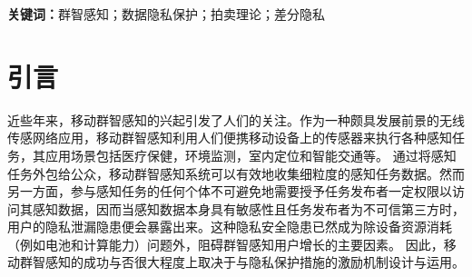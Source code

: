 
\textbf{关键词：}群智感知；数据隐私保护；拍卖理论；差分隐私

\section{引言}

	近些年来，移动群智感知的兴起引发了人们的关注。作为一种颇具发展前景的无线传感网络应用，移动群智感知利用人们便携移动设备上的传感器来执行各种感知任务，其应用场景包括医疗保健，环境监测，室内定位和智能交通等\cite{sheng2013sensing}。 
	通过将感知任务外包给公众，移动群智感知系统可以有效地收集细粒度的感知任务数据。然而另一方面，参与感知任务的任何个体不可避免地需要授予任务发布者一定权限以访问其感知数据，因而当感知数据本身具有敏感性且任务发布者为不可信第三方时，用户的隐私泄漏隐患便会暴露出来。这种隐私安全隐患已然成为除设备资源消耗（例如电池和计算能力）问题外，阻碍群智感知用户增长的主要因素。
	因此，移动群智感知的成功与否很大程度上取决于与隐私保护措施的激励机制设计与运用。
	

